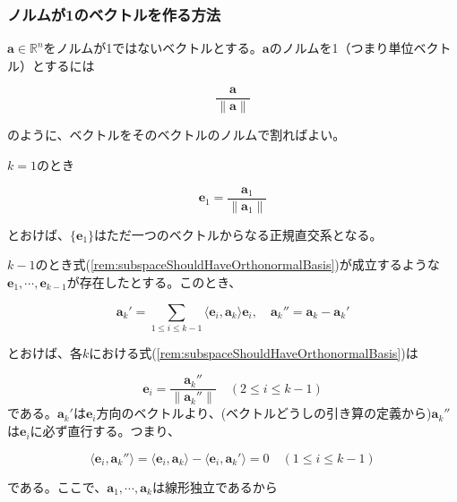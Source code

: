 \documentclass[dvipdfmx,autodetect-engine]{jsarticle}
\newcommand{\vecSpace}[1]{\mathbb{R}^{#1}}
\begin{document}
\subsubsection{ノルムが1のベクトルを作る方法}

$\bm{a} \in \vecSpace{n}$をノルムが1ではないベクトルとする。$\bm{a}$のノルムを1（つまり単位ベクトル）とするには

$$
\frac{\bm{a}}{\|\bm{a}\|}
$$

のように、ベクトルをそのベクトルのノルムで割ればよい。

\label{rem:schmidtOrthonormalization}

$k = 1$のとき

\begin{equation}
\bm{e}_1 = \frac{\bm{a}_1}{\|\bm{a}_1\|}
\label{rem:subspaceShouldHaveOrthonormalBasis}
\end{equation}

とおけば、$\{\bm{e}_1\}$はただ一つのベクトルからなる正規直交系となる。

$k - 1$のとき式(\ref{rem:subspaceShouldHaveOrthonormalBasis})が成立するような$\bm{e}_1, \cdots, \bm{e}_{k-1}$が存在したとする。このとき、

$$
\bm{a}_k' = \sum_{1 \leq i \leq k -1} \langle \bm{e}_i, \bm{a}_k \rangle \bm{e}_i, \quad \bm{a}_k'' = \bm{a}_k - \bm{a}_k'
$$

とおけば、各$k$における式(\ref{rem:subspaceShouldHaveOrthonormalBasis})は

$$
\bm{e}_i = \frac{\bm{a}_k''}{\| \bm{a}_k'' \|} \quad (2 \leq i \leq k - 1)
$$
である。$\bm{a}_k'$は$\bm{e}_i$方向のベクトルより、(ベクトルどうしの引き算の定義から)$\bm{a}_k''$は$\bm{e}_i$に必ず直行する。つまり、

$$
\langle \bm{e}_i, \bm{a}_k'' \rangle = \langle \bm{e}_i, \bm{a}_k \rangle - \langle \bm{e}_i, \bm{a}_k' \rangle = 0 \quad (1 \leq i \leq k - 1)
$$

である。ここで、$\bm{a}_1, \cdots, \bm{a}_k$は線形独立であるから
\end{document}
